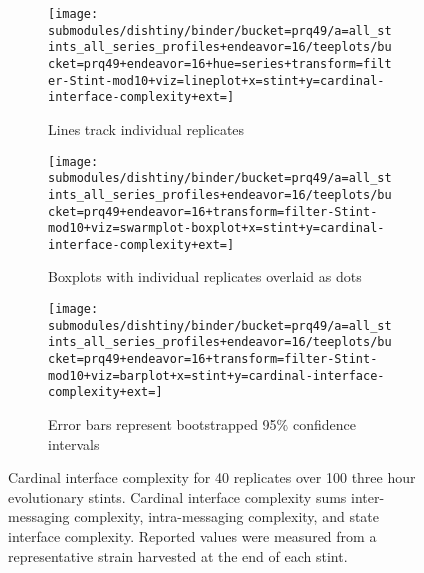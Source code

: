 \begin{figure}
\begin{center}

\begin{subfigure}[b]{\textwidth}
\centering
\texttt{[image: submodules/dishtiny/binder/bucket=prq49/a=all\_stints\_all\_series\_profiles+endeavor=16/teeplots/bucket=prq49+endeavor=16+hue=series+transform=filter-Stint-mod10+viz=lineplot+x=stint+y=cardinal-interface-complexity+ext=]}%
\caption{
Lines track individual replicates
}
\label{fig:cardinal-interface-complexity-vs-stint-lineplot}
\end{subfigure}

\begin{subfigure}[b]{\columnwidth}
\centering
\texttt{[image: submodules/dishtiny/binder/bucket=prq49/a=all\_stints\_all\_series\_profiles+endeavor=16/teeplots/bucket=prq49+endeavor=16+transform=filter-Stint-mod10+viz=swarmplot-boxplot+x=stint+y=cardinal-interface-complexity+ext=]}
\caption{
Boxplots with individual replicates overlaid as dots
}
\label{fig:cardinal-interface-complexity-vs-stint-boxplot}
\end{subfigure}

\begin{subfigure}[b]{\columnwidth}
\centering
\texttt{[image: submodules/dishtiny/binder/bucket=prq49/a=all\_stints\_all\_series\_profiles+endeavor=16/teeplots/bucket=prq49+endeavor=16+transform=filter-Stint-mod10+viz=barplot+x=stint+y=cardinal-interface-complexity+ext=]}
\caption{
Error bars represent bootstrapped 95\% confidence intervals
}
\label{fig:cardinal-interface-complexity-vs-stint-barplot}
\end{subfigure}

\caption{
Cardinal interface complexity for 40 replicates over 100 three hour evolutionary stints.
Cardinal interface complexity sums inter-messaging complexity, intra-messaging complexity, and state interface complexity.
Reported values were measured from a representative strain harvested at the end of each stint.
}
\label{fig:cardinal-interface-complexity-vs-stint}

\end{center}
\end{figure}
